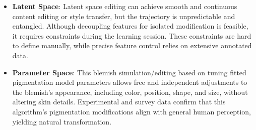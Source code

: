 \begin{spacing}{1.5}
\begin{itemize}
    \item \textbf{Latent Space}: Latent space editing can achieve smooth and continuous content editing or style transfer, but the trajectory is unpredictable and entangled. Although decoupling features for isolated modification is feasible, it requires constraints during the learning session. These constraints are hard to define manually, while precise feature control relies on extensive annotated data.

    \item \textbf{Parameter Space}: This blemish simulation/editing based on tuning fitted pigmentation model parameters allows free and independent adjustments to the blemish's appearance, including color, position, shape, and size, without altering skin details. Experimental and survey data confirm that this algorithm's pigmentation modifications align with general human perception, yielding natural transformation.
\end{itemize}

\end{spacing}
\newpage
